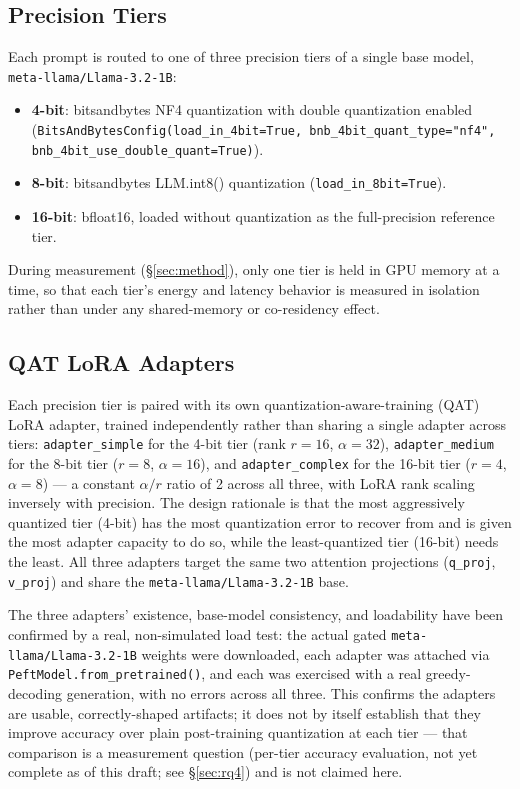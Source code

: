 \documentclass[conference]{IEEEtran}
\begin{document}
\subsection{Precision Tiers}
\label{sec:tiers}

Each prompt is routed to one of three precision tiers of a single base
model, \texttt{meta-llama/Llama-3.2-1B}:
\begin{itemize}
  \item \textbf{4-bit}: bitsandbytes NF4 quantization with double
    quantization enabled (\texttt{BitsAndBytesConfig(load\_in\_4bit=True,
    bnb\_4bit\_quant\_type="nf4", bnb\_4bit\_use\_double\_quant=True)}).
  \item \textbf{8-bit}: bitsandbytes LLM.int8() quantization
    (\texttt{load\_in\_8bit=True}).
  \item \textbf{16-bit}: bfloat16, loaded without quantization as the
    full-precision reference tier.
\end{itemize}
During measurement (\S\ref{sec:method}), only one tier is held in GPU
memory at a time, so that each tier's energy and latency behavior is
measured in isolation rather than under any shared-memory or
co-residency effect.

\subsection{QAT LoRA Adapters}
\label{sec:adapters}

Each precision tier is paired with its own quantization-aware-training
(QAT) LoRA adapter, trained independently rather than sharing a single
adapter across tiers: \texttt{adapter\_simple} for the 4-bit tier (rank
$r=16$, $\alpha=32$), \texttt{adapter\_medium} for the 8-bit tier
($r=8$, $\alpha=16$), and \texttt{adapter\_complex} for the 16-bit tier
($r=4$, $\alpha=8$) --- a constant $\alpha/r$ ratio of 2 across all
three, with LoRA rank scaling inversely with precision. The design
rationale is that the most aggressively quantized tier (4-bit) has the
most quantization error to recover from and is given the most adapter
capacity to do so, while the least-quantized tier (16-bit) needs the
least. All three adapters target the same two attention projections
(\texttt{q\_proj}, \texttt{v\_proj}) and share the
\texttt{meta-llama/Llama-3.2-1B} base.

The three adapters' existence, base-model consistency, and loadability
have been confirmed by a real, non-simulated load test: the actual gated
\texttt{meta-llama/Llama-3.2-1B} weights were downloaded, each adapter
was attached via \texttt{PeftModel.from\_pretrained()}, and each was
exercised with a real greedy-decoding generation, with no errors across
all three. This confirms the adapters are usable, correctly-shaped
artifacts; it does not by itself establish that they improve accuracy
over plain post-training quantization at each tier --- that comparison is
a measurement question (per-tier accuracy evaluation, not yet complete as
of this draft; see \S\ref{sec:rq4}) and is not claimed here.
\end{document}
